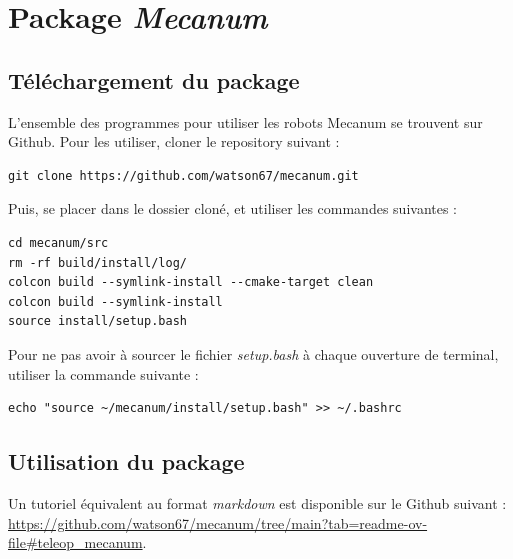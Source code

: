 \chapter{Package \textit{Mecanum}}

\section{Téléchargement du package}
L'ensemble des programmes pour utiliser les robots Mecanum se trouvent sur Github. Pour les utiliser, cloner le repository suivant : 

\begin{lstlisting}[style=commandstyle]
git clone https://github.com/watson67/mecanum.git
\end{lstlisting}

\noindent Puis, se placer dans le dossier cloné, et utiliser les commandes suivantes :

\begin{lstlisting}[style=commandstyle]
cd mecanum/src
rm -rf build/install/log/
colcon build --symlink-install --cmake-target clean
colcon build --symlink-install
source install/setup.bash
\end{lstlisting}

\noindent Pour ne pas avoir à sourcer le fichier \textit{setup.bash} à chaque ouverture de terminal, utiliser la commande suivante : 

\begin{lstlisting}[style=commandstyle]
echo "source ~/mecanum/install/setup.bash" >> ~/.bashrc
\end{lstlisting}

\section{Utilisation du package}

\noindent Un tutoriel équivalent au format \textit{markdown} est disponible sur le Github suivant : 
\url{https://github.com/watson67/mecanum/tree/main?tab=readme-ov-file#teleop_mecanum}.

